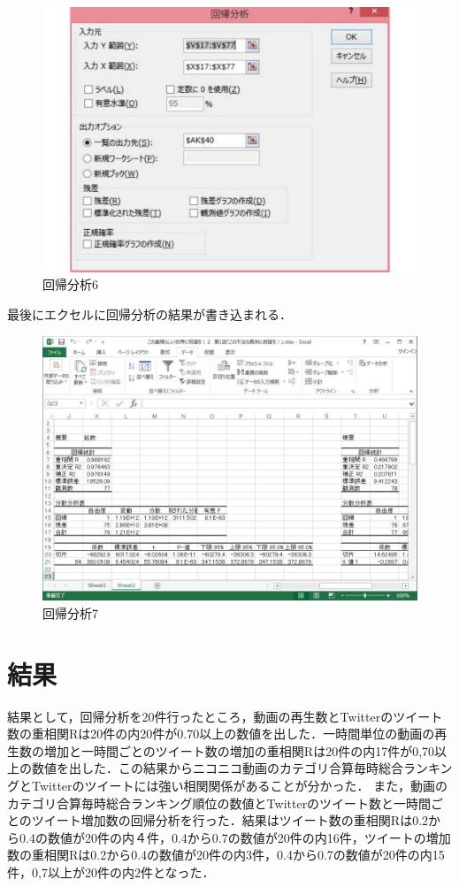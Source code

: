\begin{figure}[htb]
\centering
\includegraphics[width=14cm]{ekuseru07.pdf}
\caption{回帰分析6}\label{ace}
\end{figure}

\clearpage

最後にエクセルに回帰分析の結果が書き込まれる．

\begin{figure}[htb]
\centering
\includegraphics[width=14cm]{ekuseru08.pdf}
\caption{回帰分析7}\label{ace}
\end{figure}

\chapter{結果}
結果として，回帰分析を20件行ったところ，動画の再生数とTwitterのツイート数の重相関Rは20件の内20件が0.70以上の数値を出した．一時間単位の動画の再生数の増加と一時間ごとのツイート数の増加の重相関Rは20件の内17件が0,70以上の数値を出した．この結果からニコニコ動画のカテゴリ合算毎時総合ランキングとTwitterのツイートには強い相関関係があることが分かった．
また，動画のカテゴリ合算毎時総合ランキング順位の数値とTwitterのツイート数と一時間ごとのツイート増加数の回帰分析を行った．結果はツイート数の重相関Rは0.2から0.4の数値が20件の内４件，0.4から0.7の数値が20件の内16件，ツイートの増加数の重相関Rは0.2から0.4の数値が20件の内3件，0.4から0.7の数値が20件の内15件，0,7以上が20件の内2件となった．
